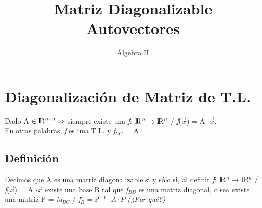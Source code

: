 \documentclass{article}
\title{Matriz Diagonalizable \\Autovectores}
\author{Álgebra II}
\date{\vspace{-5ex}}
\begin{document}
\maketitle{}
\section{Diagonalización de Matriz de T.L.}
Dado A $\in {\rm I\!R}^{nxn} \Rightarrow$ siempre existe una \textit{f}: ${\rm I\!R}$$^{n}\rightarrow {\rm I\!R}^{n}$ / \textit{f}($\vec{x}$) = A $\cdot \vec{x}$. \\
En otras palabras, \textit{f} es una T.L. y \textbardbl \textit{f}\textbardbl $_{CC}$ = A
\subsection{Definición}
Decimos que A es una matriz diagonalizable si y sólo si, al definir \textit{f}: ${\rm I\!R}$$^{n}\rightarrow ${\rm I\!R}$^{n}$ / \textit{f}($\vec{x}$) = A $\cdot \vec{x}$ existe una base B tal que \textbardbl \textit{f}\textbardbl $_{BB}$ es una matriz diagonal, o sea existe una matriz P = \textbardbl \textit{id}\textbardbl $_{BC}$ / \textbardbl \textit{f}\textbardbl $_{B}$ = P$^{-1}\cdot A \cdot P$ \textit{(¿Por qué?)}
\end{document}
